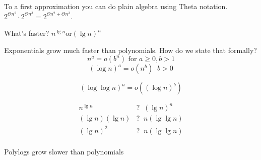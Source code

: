 \documentclass[english, 10pt]{article}
\begin{document}
To a first approximation you can do plain algebra using Theta notation.  $2^{\Theta n^2}\cdot 2^{\Theta n^3}= 2^{\Theta n^2 + \Theta n^3}$.

What's faster? $n^{\lg n} \text{or} {(\lg n)}^n$

Exponentials grow much faster than polynomials. How do we state that formally?
$$n^a = o(b^n) \text{ for } a\ge 0, b>1$$
$${(\log n)}^a = o(n^b) \;\; b>0$$

$${(\log\log n)}^a = o({(\log n)}^b) $$

\begin{align*}
    n^{\lg n } \;\;&?\;\; {(\lg n)}^n \\
    (\lg n)(\lg n) &?\;\; n(\lg\lg n) \\
    {(\lg n)}^2 \;\;&?\;\; n(\lg\lg n) \\
\end{align*}

Polylogs grow slower than polynomials
\end{document}
